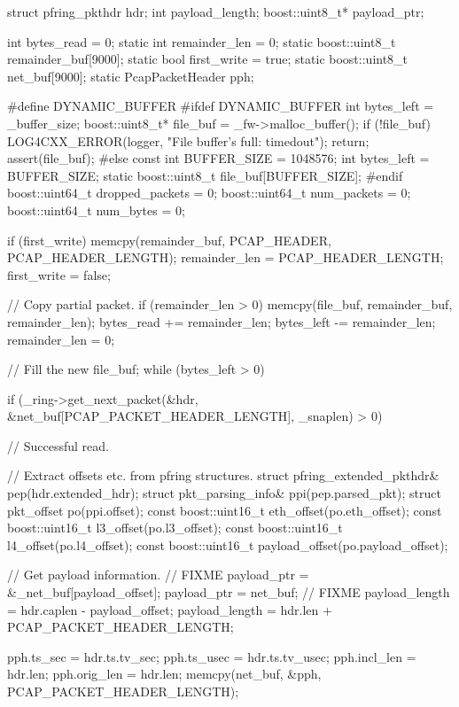\begin{DoxyCode}
                                         {
  struct pfring_pkthdr hdr;
  int payload_length;
  boost::uint8_t* payload_ptr;
  
  int bytes_read = 0;
  static int remainder_len = 0;
  static boost::uint8_t remainder_buf[9000];
  static bool first_write = true;
  static boost::uint8_t net_buf[9000];
  static PcapPacketHeader pph;

#define DYNAMIC_BUFFER
#ifdef DYNAMIC_BUFFER
  int bytes_left = _buffer_size;
  boost::uint8_t* file_buf = _fw->malloc_buffer();
  if (!file_buf) {
    LOG4CXX_ERROR(logger, "File buffer's full: timedout");
    return;
  }
  assert(file_buf);
#else
  const int BUFFER_SIZE = 1048576;
  int bytes_left = BUFFER_SIZE;
  static boost::uint8_t file_buf[BUFFER_SIZE];
#endif
  boost::uint64_t dropped_packets = 0;
  boost::uint64_t num_packets = 0;
  boost::uint64_t num_bytes = 0;

  if (first_write) {
    memcpy(remainder_buf, PCAP_HEADER, PCAP_HEADER_LENGTH);
    remainder_len = PCAP_HEADER_LENGTH;
    first_write = false;
  }

  // Copy partial packet.
  if (remainder_len > 0) {
    memcpy(file_buf, remainder_buf, remainder_len);
    bytes_read += remainder_len;
    bytes_left -= remainder_len;
    remainder_len = 0;
  }

  // Fill the new file_buf;
  while (bytes_left > 0) {
    if (_ring->get_next_packet(&hdr, &net_buf[PCAP_PACKET_HEADER_LENGTH],
                   _snaplen) > 0) {
      // Successful read.

      // Extract offsets etc. from pfring structures.
      struct pfring_extended_pkthdr& pep(hdr.extended_hdr);
      struct pkt_parsing_info& ppi(pep.parsed_pkt);
      struct pkt_offset po(ppi.offset);
      const boost::uint16_t eth_offset(po.eth_offset);
      const boost::uint16_t l3_offset(po.l3_offset);
      const boost::uint16_t l4_offset(po.l4_offset);
      const boost::uint16_t payload_offset(po.payload_offset);

      // Get payload information.
      // FIXME payload_ptr = &_net_buf[payload_offset];
      payload_ptr = net_buf;
      // FIXME payload_length = hdr.caplen - payload_offset;
      payload_length = hdr.len + PCAP_PACKET_HEADER_LENGTH;

      pph.ts_sec = hdr.ts.tv_sec;
      pph.ts_usec = hdr.ts.tv_usec;
      pph.incl_len = hdr.len;
      pph.orig_len = hdr.len;
      memcpy(net_buf, &pph, PCAP_PACKET_HEADER_LENGTH);

}}}
\end{DoxyCode}
